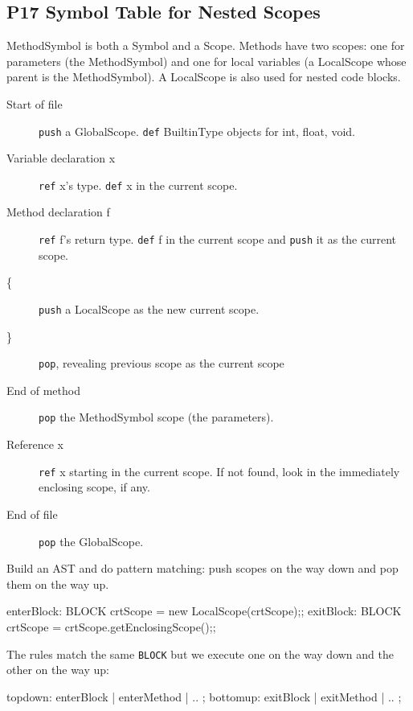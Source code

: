 \subsection{P17 Symbol Table for Nested Scopes}

MethodSymbol is both a Symbol and a Scope.
Methods have two scopes: one for parameters (the MethodSymbol)
and one for local variables (a LocalScope whose parent is the MethodSymbol).
A LocalScope is also used for nested code blocks.

\begin{description}
\item[Start of file]
\verb=push= a GlobalScope. \verb=def= BuiltinType objects for int, float, void.

\item[Variable declaration x]
\verb=ref= x's type. \verb=def= x in the current scope.

\item[Method declaration f]
\verb=ref= f's return type.
\verb=def= f in the current scope and \verb=push= it as the current scope.

\item[\{]
\verb=push= a LocalScope as the new current scope.

\item[\}]
\verb=pop=, revealing previous scope as the current scope

\item[End of method]
\verb=pop= the MethodSymbol scope (the parameters).

\item[Reference x]
\verb=ref= x starting in the current scope.
If not found, look in the immediately enclosing scope, if any.

\item[End of file]
\verb=pop= the GlobalScope.
\end{description}

Build an AST and do pattern matching:
push scopes on the way down and pop them on the way up.

\begin{verbatimtab}
enterBlock:	BLOCK {crtScope = new LocalScope(crtScope);};
exitBlock:	BLOCK {crtScope = crtScope.getEnclosingScope();};
\end{verbatimtab}

The rules match the same \verb=BLOCK= but we execute one on the way down and the other on the way up:

\begin{verbatimtab}
topdown:	enterBlock | enterMethod | .. ;
bottomup:	exitBlock | exitMethod | .. ;
\end{verbatimtab}

